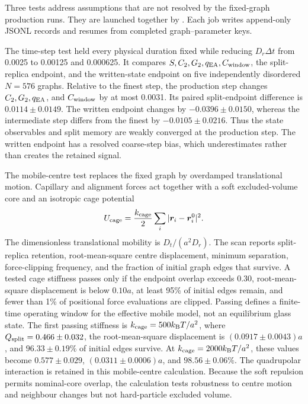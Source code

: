 \documentclass[aps,prl,onecolumn,superscriptaddress,nofootinbib]{revtex4-2}
\begin{document}
Three tests address assumptions that are not resolved by the fixed-graph
production runs. They are launched together by
. Each
job writes append-only JSONL records and resumes from completed graph--parameter
keys.

The time-step test held every physical duration fixed while reducing
\(D_r\Delta t\) from 0.0025 to 0.00125 and 0.000625. It compares
\(S,C_2,G_2,q_{\rm EA},C_{\rm window}\), the split-replica endpoint, and the
written-state endpoint on five independently disordered \(N=576\) graphs.
Relative to the finest step, the production step changes \(C_2,G_2,q_{\rm
EA}\), and \(C_{\rm window}\) by at most 0.0031. Its paired split-endpoint
difference is \(0.0114\pm0.0149\). The written endpoint changes by
\(-0.0396\pm0.0150\), whereas the intermediate step differs from the finest
by \(-0.0105\pm0.0216\). Thus the state observables and split memory are
weakly converged at the production step. The written endpoint has a resolved
coarse-step bias, which underestimates rather than creates the retained
signal.

The mobile-centre test replaces the fixed graph by overdamped translational
motion. Capillary and alignment forces act together with a soft excluded-volume
core and an isotropic cage potential
\begin{equation}
 U_{\rm cage}=\frac{k_{\rm cage}}{2}
 \sum_i|\bm r_i-\bm r_i^0|^2.
\end{equation}
The dimensionless translational mobility is
\(D_t/(a^2D_r)\). The scan reports split-replica retention, root-mean-square
centre displacement, minimum separation, force-clipping frequency, and the
fraction of initial graph edges that survive. A tested cage stiffness passes
only if the endpoint overlap exceeds 0.30, root-mean-square displacement is
below \(0.10a\), at least 95\% of initial edges remain, and fewer than 1\% of
positional force evaluations are clipped. Passing defines a finite-time
operating window for the effective mobile model, not an equilibrium glass
state. The first passing stiffness is
\(k_{\rm cage}=500k_{\rm B}T/a^2\), where
\(Q_{\rm split}=0.466\pm0.032\), the root-mean-square displacement is
\((0.0917\pm0.0043)a\), and \(96.33\pm0.19\%\) of initial edges survive.
At \(k_{\rm cage}=2000k_{\rm B}T/a^2\), these values become
\(0.577\pm0.029\), \((0.0311\pm0.0006)a\), and
\(98.56\pm0.06\%\). The quadrupolar interaction is retained in this
mobile-centre calculation. Because the soft repulsion permits nominal-core
overlap, the calculation tests robustness to centre motion and neighbour
changes but not hard-particle excluded volume.
\end{document}

